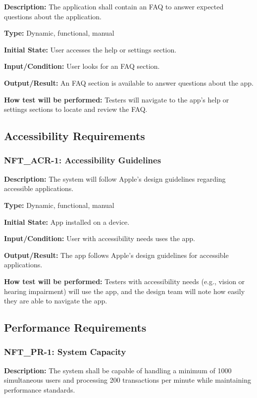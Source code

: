 \documentclass[12pt, titlepage]{article}
\begin{document}
\textbf{Description: }The application shall contain an FAQ to answer expected questions about the application.

\textbf{Type: }Dynamic, functional, manual

\textbf{Initial State:} User accesses the help or settings section.

\textbf{Input/Condition:} User looks for an FAQ section.

\textbf{Output/Result: }An FAQ section is available to answer questions about the app.

\textbf{How test will be performed: }Testers will navigate to the app's help or settings sections to locate and review the FAQ.
\newline
\subsection{Accessibility Requirements}


\subsubsection*{\textbf{NFT\_ACR-1: }Accessibility Guidelines}

\textbf{Description: }The system will follow Apple’s design guidelines regarding accessible applications.

\textbf{Type:} Dynamic, functional, manual

\textbf{Initial State:} App installed on a device.

\textbf{Input/Condition: }User with accessibility needs uses the app.

\textbf{Output/Result: }The app follows Apple’s design guidelines for accessible applications.

\textbf{How test will be performed:} Testers with accessibility needs (e.g., vision or hearing impairment) will use the app, and the design team will note how easily they are able to navigate the app. 
\newline
\subsection{Performance Requirements}


\subsubsection*{\textbf{NFT\_PR-1: System Capacity}
}

\textbf{Description: }The system shall be capable of handling a minimum of 1000 simultaneous users and processing 200 transactions per minute while maintaining performance standards.
\end{document}
